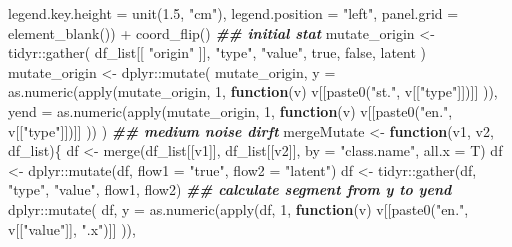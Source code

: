 \documentclass[
]{article}
\newenvironment{Shaded}{\begin{snugshade}}{\end{snugshade}}
\newcommand{\AttributeTok}[1]{\textcolor[rgb]{0.77,0.63,0.00}{#1}}
\newcommand{\ControlFlowTok}[1]{\textcolor[rgb]{0.13,0.29,0.53}{\textbf{#1}}}
\newcommand{\DecValTok}[1]{\textcolor[rgb]{0.00,0.00,0.81}{#1}}
\newcommand{\DocumentationTok}[1]{\textcolor[rgb]{0.56,0.35,0.01}{\textbf{\textit{#1}}}}
\newcommand{\FloatTok}[1]{\textcolor[rgb]{0.00,0.00,0.81}{#1}}
\newcommand{\FunctionTok}[1]{\textcolor[rgb]{0.00,0.00,0.00}{#1}}
\newcommand{\NormalTok}[1]{#1}
\newcommand{\OtherTok}[1]{\textcolor[rgb]{0.56,0.35,0.01}{#1}}
\newcommand{\SpecialCharTok}[1]{\textcolor[rgb]{0.00,0.00,0.00}{#1}}
\newcommand{\StringTok}[1]{\textcolor[rgb]{0.31,0.60,0.02}{#1}}
\begin{document}
\begin{Shaded}
\begin{Highlighting}[]
        \AttributeTok{legend.key.height =} \FunctionTok{unit}\NormalTok{(}\FloatTok{1.5}\NormalTok{, }\StringTok{"cm"}\NormalTok{),}
        \AttributeTok{legend.position =} \StringTok{"left"}\NormalTok{,}
        \AttributeTok{panel.grid =} \FunctionTok{element\_blank}\NormalTok{()) }\SpecialCharTok{+}
      \FunctionTok{coord\_flip}\NormalTok{()}
    \DocumentationTok{\#\# initial stat}
\NormalTok{    mutate\_origin }\OtherTok{\textless{}{-}}\NormalTok{ tidyr}\SpecialCharTok{::}\FunctionTok{gather}\NormalTok{(}
\NormalTok{      df\_list[[ }\StringTok{"origin"}\NormalTok{ ]], }\StringTok{"type"}\NormalTok{, }\StringTok{"value"}\NormalTok{, true, false, latent}
\NormalTok{    )}
\NormalTok{    mutate\_origin }\OtherTok{\textless{}{-}}\NormalTok{ dplyr}\SpecialCharTok{::}\FunctionTok{mutate}\NormalTok{(}
\NormalTok{      mutate\_origin,}
      \AttributeTok{y =} \FunctionTok{as.numeric}\NormalTok{(}\FunctionTok{apply}\NormalTok{(mutate\_origin, }\DecValTok{1}\NormalTok{, }\ControlFlowTok{function}\NormalTok{(v) v[[}\FunctionTok{paste0}\NormalTok{(}\StringTok{"st."}\NormalTok{, v[[}\StringTok{"type"}\NormalTok{]])]] )),}
      \AttributeTok{yend =} \FunctionTok{as.numeric}\NormalTok{(}\FunctionTok{apply}\NormalTok{(mutate\_origin, }\DecValTok{1}\NormalTok{, }\ControlFlowTok{function}\NormalTok{(v) v[[}\FunctionTok{paste0}\NormalTok{(}\StringTok{"en."}\NormalTok{, v[[}\StringTok{"type"}\NormalTok{]])]] ))}
\NormalTok{    )}
    \DocumentationTok{\#\# medium noise dirft}
\NormalTok{    mergeMutate }\OtherTok{\textless{}{-}}
      \ControlFlowTok{function}\NormalTok{(v1, v2, df\_list)\{}
\NormalTok{        df }\OtherTok{\textless{}{-}} \FunctionTok{merge}\NormalTok{(df\_list[[v1]], df\_list[[v2]], }\AttributeTok{by =} \StringTok{"class.name"}\NormalTok{, }\AttributeTok{all.x =}\NormalTok{ T)}
\NormalTok{        df }\OtherTok{\textless{}{-}}\NormalTok{ dplyr}\SpecialCharTok{::}\FunctionTok{mutate}\NormalTok{(df, }\AttributeTok{flow1 =} \StringTok{"true"}\NormalTok{, }\AttributeTok{flow2 =} \StringTok{"latent"}\NormalTok{)}
\NormalTok{        df }\OtherTok{\textless{}{-}}\NormalTok{ tidyr}\SpecialCharTok{::}\FunctionTok{gather}\NormalTok{(df, }\StringTok{"type"}\NormalTok{, }\StringTok{"value"}\NormalTok{, flow1, flow2)}
        \DocumentationTok{\#\# calculate segment from y to yend}
\NormalTok{        dplyr}\SpecialCharTok{::}\FunctionTok{mutate}\NormalTok{(}
\NormalTok{          df, }\AttributeTok{y =} \FunctionTok{as.numeric}\NormalTok{(}\FunctionTok{apply}\NormalTok{(df, }\DecValTok{1}\NormalTok{, }\ControlFlowTok{function}\NormalTok{(v) v[[}\FunctionTok{paste0}\NormalTok{(}\StringTok{"en."}\NormalTok{, v[[}\StringTok{"value"}\NormalTok{]], }\StringTok{".x"}\NormalTok{)]] )),}

\end{Highlighting}
\end{Shaded}
\end{document}
